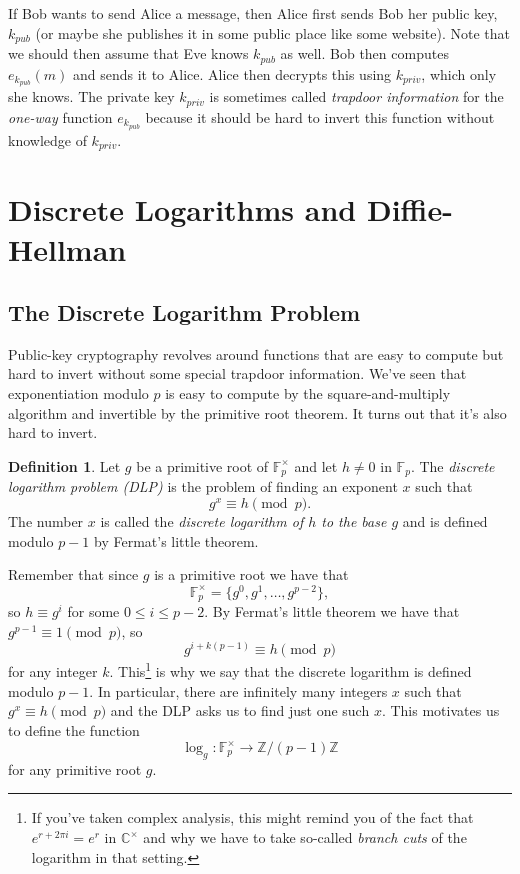 \documentclass[12pt]{article}
\theoremstyle{plain}
\theoremstyle{definition}
\newtheorem{definition}[theorem]{Definition}
\theoremstyle{remark}
\newcommand{\Z}{\mathbb{Z}}
\newcommand{\C}{\mathbb{C}}
\newcommand{\F}{\mathbb{F}}
\begin{document}
If Bob wants to send Alice a message, then Alice first sends Bob her public key, $k_{pub}$ (or maybe she publishes it in some public place like some website).
Note that we should then assume that Eve knows $k_{pub}$ as well.
Bob then computes $e_{k_{pub}}(m)$ and sends it to Alice.
Alice then decrypts this using $k_{priv}$, which only she knows.
The private key $k_{priv}$ is sometimes called \emph{trapdoor information} for the \emph{one-way} function $e_{k_{pub}}$ because it should be hard to invert this function without knowledge of $k_{priv}$.









\section{Discrete Logarithms and Diffie-Hellman}
\addtocounter{subsection}{1}
\subsection{The Discrete Logarithm Problem}
Public-key cryptography revolves around functions that are easy to compute but hard to invert without some special trapdoor information.
We've seen that exponentiation modulo $p$ is easy to compute by the square-and-multiply algorithm and invertible by the primitive root theorem.
It turns out that it's also hard to invert.

\begin{definition}
    Let $g$ be a primitive root of $\F_p^\times$ and let $h\neq 0$ in $\F_p$.
    The \emph{discrete logarithm problem (DLP)} is the problem of finding an exponent $x$ such that
    \[
        g^x\equiv h\pmod p.
    \]
    The number $x$ is called the \emph{discrete logarithm of $h$ to the base $g$} and is defined modulo $p-1$ by Fermat's little theorem.
\end{definition}

Remember that since $g$ is a primitive root we have that
\[
    \F_p^\times = \{g^0, g^1, \ldots, g^{p-2}\},
\]
so $h \equiv g^i$ for some $0 \leq i \leq p-2$.
By Fermat's little theorem we have that $g^{p-1}\equiv 1\pmod p$, so
\[
    g^{i + k(p-1)} \equiv h\pmod p
\]
for any integer $k$.
This\footnote{If you've taken complex analysis, this might remind you of the fact that $e^{r + 2\pi i} = e^r$ in $\C^\times$ and why we have to take so-called \emph{branch cuts} of the logarithm in that setting.} is why we say that the discrete logarithm is defined modulo $p-1$.
In particular, there are infinitely many integers $x$ such that $g^x\equiv h\pmod p$ and the DLP asks us to find just one such $x$.
This motivates us to define the function
\[
    \log_g: \F_p^\times \to \Z/(p-1)\Z
\]
for any primitive root $g$.
\end{document}

